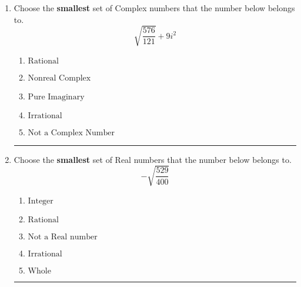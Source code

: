 \documentclass[14pt]{extbook}
\newcommand{\litem}[1]{\item#1\hspace*{-1cm}\rule{\textwidth}{0.4pt}}
\begin{document}
\begin{enumerate}
{\begin{enumerate}[label=\Alph*.]
\end{enumerate} }
\litem{
Choose the \textbf{smallest} set of Complex numbers that the number below belongs to.\[ \sqrt{\frac{576}{121}} + 9i^2 \]\begin{enumerate}[label=\Alph*.]
\item \( \text{Rational} \)
\item \( \text{Nonreal Complex} \)
\item \( \text{Pure Imaginary} \)
\item \( \text{Irrational} \)
\item \( \text{Not a Complex Number} \)

\end{enumerate} }
\litem{
Choose the \textbf{smallest} set of Real numbers that the number below belongs to.\[ -\sqrt{\frac{529}{400}} \]\begin{enumerate}[label=\Alph*.]
\item \( \text{Integer} \)
\item \( \text{Rational} \)
\item \( \text{Not a Real number} \)
\item \( \text{Irrational} \)
\item \( \text{Whole} \)

\end{enumerate} }
\end{enumerate}
\end{document}
